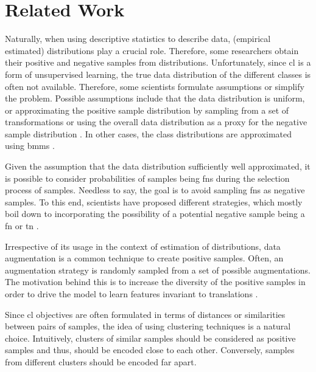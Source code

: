 \section{Related Work}\label{sec:related_work}

Naturally, when using descriptive statistics to describe data, (empirical estimated) distributions play a crucial role.
Therefore, some researchers obtain their positive and negative samples from distributions.
Unfortunately, since \ac{cl} is a form of unsupervised learning, 
the true data distribution of the different classes is often not available.
Therefore, some scientists formulate assumptions or simplify the problem.
Possible assumptions include that the data distribution is uniform,
or approximating the positive sample distribution by sampling from a set of transformations 
or using the overall data distribution as a proxy for the negative sample distribution \citet{chuang_debiased_2020,robinson_contrastive_2021}.
In other cases, the class distributions are approximated using \acp{bmm} \citet{progcl_2022}.

Given the assumption that the data distribution sufficiently well approximated, 
it is possible to consider probabilities of samples being \acp{fn} during the selection process of samples.
Needless to say, the goal is to avoid sampling \acp{fn} as negative samples.
To this end, scientists have proposed different strategies, which mostly boil down to 
incorporating the possibility of a potential negative sample being a \ac{fn} or \ac{tn} 
\citet{chuang_debiased_2020,robinson_contrastive_2021,progcl_2022}.


Irrespective of its usage in the context of estimation of distributions, 
data augmentation is a common technique to create positive samples.
Often, an augmentation strategy is randomly sampled from a set of possible augmentations.
The motivation behind this is to increase the diversity of the positive samples 
in order to drive the model to learn features invariant to translations 
\citet{PIC_2020,swav_2020,local_aggr_2019,grape_2024,CL_temp_2021}.


Since \ac{cl} objectives are often formulated in terms of distances or similarities between pairs of samples, 
the idea of using clustering techniques is a natural choice.
Intuitively, clusters of similar samples should be considered as positive samples and thus,
should be encoded close to each other.
Conversely, samples from different clusters should be encoded far apart.

